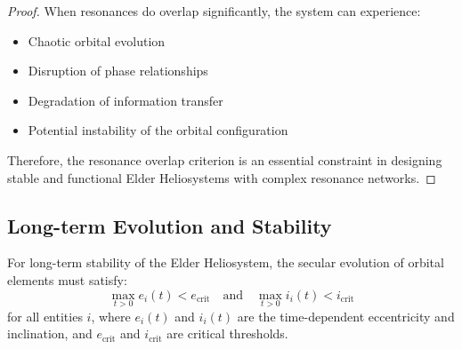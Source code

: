 \begin{proof}
When resonances do overlap significantly, the system can experience:
\begin{itemize}
    \item Chaotic orbital evolution
    \item Disruption of phase relationships
    \item Degradation of information transfer
    \item Potential instability of the orbital configuration
\end{itemize}

Therefore, the resonance overlap criterion is an essential constraint in designing stable and functional Elder Heliosystems with complex resonance networks.
\end{proof}

\subsection{Long-term Evolution and Stability}

\begin{theorem}
For long-term stability of the Elder Heliosystem, the secular evolution of orbital elements must satisfy:
\begin{equation}
\max_{t > 0} e_i(t) < e_{\text{crit}} \quad \text{and} \quad \max_{t > 0} i_i(t) < i_{\text{crit}}
\end{equation}
for all entities $i$, where $e_i(t)$ and $i_i(t)$ are the time-dependent eccentricity and inclination, and $e_{\text{crit}}$ and $i_{\text{crit}}$ are critical thresholds.
\end{theorem}

